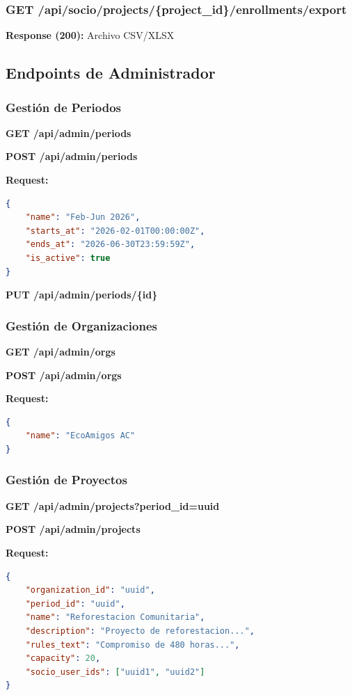 \documentclass[12pt,a4paper]{article}
\begin{document}
\subsubsection{GET /api/socio/projects/\{project\_id\}/enrollments/export}

\textbf{Response (200):} Archivo CSV/XLSX

\subsection{Endpoints de Administrador}

\subsubsection{Gestión de Periodos}

\textbf{GET /api/admin/periods}

\textbf{POST /api/admin/periods}

\textbf{Request:}
\begin{lstlisting}[language=json]
{
    "name": "Feb-Jun 2026",
    "starts_at": "2026-02-01T00:00:00Z",
    "ends_at": "2026-06-30T23:59:59Z",
    "is_active": true
}
\end{lstlisting}

\textbf{PUT /api/admin/periods/\{id\}}

\subsubsection{Gestión de Organizaciones}

\textbf{GET /api/admin/orgs}

\textbf{POST /api/admin/orgs}

\textbf{Request:}
\begin{lstlisting}[language=json]
{
    "name": "EcoAmigos AC"
}
\end{lstlisting}

\subsubsection{Gestión de Proyectos}

\textbf{GET /api/admin/projects?period\_id=uuid}

\textbf{POST /api/admin/projects}

\textbf{Request:}
\begin{lstlisting}[language=json]
{
    "organization_id": "uuid",
    "period_id": "uuid",
    "name": "Reforestacion Comunitaria",
    "description": "Proyecto de reforestacion...",
    "rules_text": "Compromiso de 480 horas...",
    "capacity": 20,
    "socio_user_ids": ["uuid1", "uuid2"]
}
\end{lstlisting}
\end{document}
